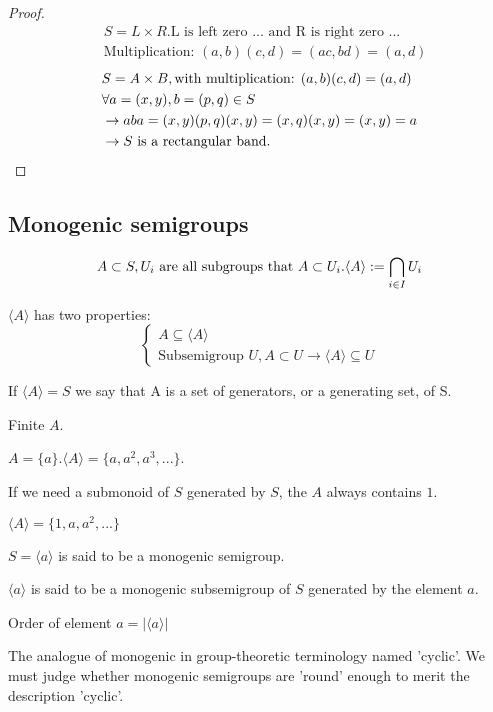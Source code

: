\begin{Them}
\begin{proof}
        \begin{align*}
            &S=L\times R.\text{L is left zero ... and R is right zero ...}  \\
            &\text{Multiplication: } (a,b)(c,d)=(ac,bd)=(a,d)
        \end{align*}
        \begin{align*}
            &S=A\times B, \text{with multiplication: }(a,b)(c,d)=(a,d)\\
            &\forall a=(x,y),b=(p,q)\in S   \\
            &\rightarrow aba=(x,y)(p,q)(x,y)=(x,q)(x,y)=(x,y)=a \\
            &\rightarrow S\text{\space is a rectangular band.}
        \end{align*}
    \end{proof}
\end{Them}

\subsection[2]{Monogenic semigroups}

\begin{Sym}
    \[
        A \subset S, U_i \text{\space are all subgroups that }A \subset U_i.\langle A \rangle:=\bigcap_{i \in I}U_i
    \]
    
    $\langle A \rangle$ has two properties:
    \[\begin{cases}
        A \subseteq \langle A\rangle    \\
        \text{Subsemigroup } U, A\subset U \rightarrow \langle A\rangle \subseteq U
    \end{cases}\]

    If $\langle A\rangle = S$ we say that A is a set of generators, or a generating set, of S.
\end{Sym}

\begin{Exap}
    Finite $A$.

    $A=\{a\}. \langle A\rangle=\{a,a^2,a^3,...\}$.

    If we need a submonoid of $S$ generated by $S$, the $A$ always contains $1$.

    $\langle A \rangle=\{1,a,a^2,...\}$
\end{Exap}

\begin{Def}
    $S=\langle a\rangle$ is said to be a monogenic semigroup.

    $\langle a\rangle$ is said to be a monogenic subsemigroup of $S$ generated by the element $a$.

    Order of element $a = |\langle a\rangle|$

    The analogue of monogenic in group-theoretic terminology named 'cyclic'. We must judge whether monogenic semigroups are 'round' enough to merit the description 'cyclic'. 
\end{Def}

